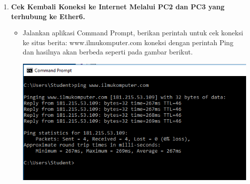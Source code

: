 \documentclass[a4paper,12pt]{article}
\begin{document}
\begin{enumerate}[label=\textbf{\arabic*.}]
    \item \textbf{Cek Kembali Koneksi ke Internet Melalui PC2 dan PC3 yang terhubung ke Ether6.}
        \begin{itemize}
            \item Jalankan aplikasi Command Prompt, berikan perintah untuk cek koneksi ke situs berita: www.ilmukomputer.com koneksi dengan perintah Ping dan hasilnya akan berbeda seperti pada gambar berikut.
                \begin{center}
                    \includegraphics[width=0.8\linewidth]{image14.png}
                \end{center}
        \end{itemize}


\end{enumerate}
\end{document}
